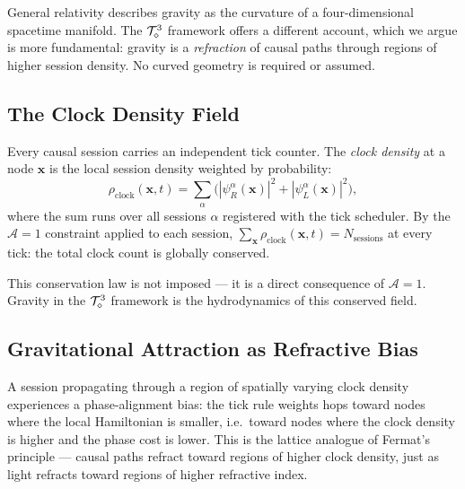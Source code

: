 
\label{sec:gravity}

General relativity describes gravity as the curvature of a four-dimensional
spacetime manifold.
The $\mathcal{T}_\diamond^3$ framework offers a different account, which we argue is
more fundamental: gravity is a \emph{refraction} of causal paths through
regions of higher session density.
No curved geometry is required or assumed.

\subsection{The Clock Density Field}
\label{subsec:clock_density_field}

Every causal session carries an independent tick counter.
The \emph{clock density} at a node $\mathbf{x}$ is the local
session density weighted by probability:
\begin{equation}
    \rho_\text{clock}(\mathbf{x}, t)
        = \sum_\alpha \bigl(|\psi_R^\alpha(\mathbf{x})|^2
                          + |\psi_L^\alpha(\mathbf{x})|^2\bigr),
    \label{eq:clock_density}
\end{equation}
where the sum runs over all sessions $\alpha$ registered with the
tick scheduler.
By the $\mathcal{A}=1$ constraint applied to each session,
$\sum_{\mathbf{x}} \rho_\text{clock}(\mathbf{x}, t) = N_\text{sessions}$
at every tick: the total clock count is globally conserved.

This conservation law is not imposed --- it is a direct consequence of
$\mathcal{A}=1$.
Gravity in the $\mathcal{T}_\diamond^3$ framework is the hydrodynamics of this
conserved field.

\subsection{Gravitational Attraction as Refractive Bias}
\label{subsec:refraction}

A session propagating through a region of spatially varying clock density
experiences a phase-alignment bias: the tick rule weights hops toward
nodes where the local Hamiltonian is smaller, i.e.\ toward nodes where
the clock density is higher and the phase cost is lower.
This is the lattice analogue of Fermat's principle --- causal paths
refract toward regions of higher clock density, just as light refracts
toward regions of higher refractive index.

